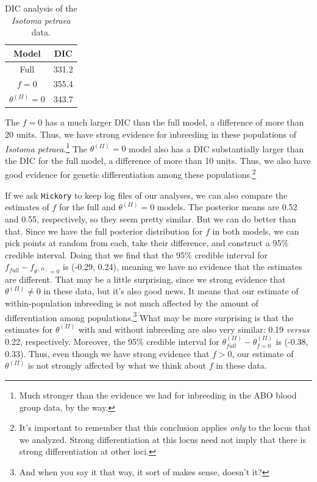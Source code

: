 \documentclass[12pt]{article}
\begin{document}
\begin{table}
\begin{center}
\begin{tabular}{cc}
\hline\hline
Model & DIC \\
\hline
Full             & 331.2 \\
$f=0$            & 355.4 \\
$\theta^{(II)}=0$ & 343.7 \\
\hline
\end{tabular}
\caption{DIC analysis of the {\it Isotoma petraea\/}
    data.}\label{table:dic}
\end{center}
\end{table}

The $f=0$ has a much larger DIC than the full model, a difference of
more than 20 units. Thus, we have strong evidence for inbreeding in
these populations of {\it Isotoma petraea}.\footnote{Much stronger
  than the evidence we had for inbreeding in the ABO blood group data,
  by the way.} The $\theta^{(II)} = 0$ model also has a DIC
substantially larger than the DIC for the full model, a difference of
more than 10 units. Thus, we also have good evidence for genetic
differentiation among these populations.\footnote{It's important to
  remember that this conclusion applies {\it only\/} to the locus that
  we analyzed. Strong differentiation at this locus need not imply
  that there is strong differentiation at other loci.}

If we ask {\tt Hickory} to keep log files of our analyses, we can also
compare the estimates of $f$ for the full and $\theta^{(II)}=0$
models. The posterior means are 0.52 and 0.55, respectively, so they
seem pretty similar. But we can do better than that. Since we have the
full posterior distribution for $f$ in both models, we can pick points
at random from each, take their difference, and construct a 95\%
credible interval. Doing that we find that the 95\% credible interval
for $f_{full} - f_{\theta^{(II)}=0}$ is (-0.29, 0.24), meaning we have
no evidence that the estimates are different. That may be a little
surprising, since we strong evidence that $\theta^{(II)} \ne 0$ in
these data, but it's also good news. It means that our estimate of
within-population inbreeding is not much affected by the amount of
differentiation among populations.\footnote{And when you say it that
  way, it sort of makes sense, doesn't it?} What may be more
surprising is that the estimates for $\theta^{(II)}$ with and without
inbreeding are also very similar: 0.19 {\it versus\/} 0.22,
respectively. Moreover, the 95\% credible interval for
$\theta^{(II)}_{full} - \theta^{(II)}_{f=0}$ is (-0.38, 0.33). Thus,
even though we have strong evidence that $f > 0$, our estimate of
$\theta^{(II)}$ is not strongly affected by what we think about $f$ in
these data.
\end{document}
